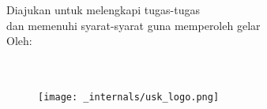 %
%
%

\begin{titlepage}

    \begin{center}
        \vspace*{3em}
        {\fontsize{20}{20}
            \textbf{\Judul} \\[3em]
        }
        {\fontsize{16}{20}
            \textbf{\Type} \\[3em] 
        }
        {\fontsize{12}{20}
            {Diajukan untuk melengkapi tugas-tugas \\dan memenuhi syarat-syarat guna memperoleh gelar 
            \gelar} \\[3em]
        }
        {\fontsize{14}{20}
            {Oleh:} \\[3em]
        }
        {\fontsize{14}{20}
            \underline{\bo{\Penulis}} \\
            \bo{\npm} \\[3em]
        }
        
        \begin{figure}
            \begin{center}
                \texttt{[image: \_internals/usk\_logo.png]}
            \end{center}
        \end{figure}    
        \vspace*{2em}
        
        \begin{center}
            {\fontsize{13}{20}
                 \\
                \vspace{0.1em}
                 \\
                \vspace{0.1em}
                 \\
                \vspace{0.1em}
                \bo{\bulan, \tahun}
            }
        \end{center}
    \end{center}
\end{titlepage}